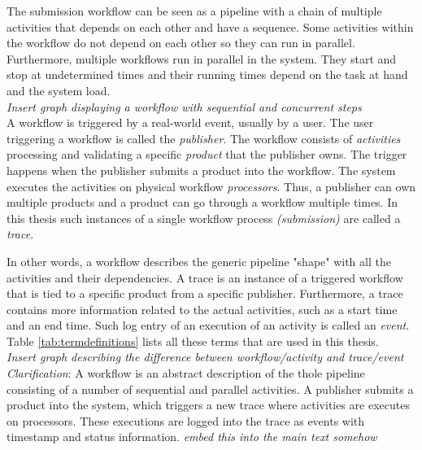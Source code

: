 \documentclass[english,12pt,a4paper,pdftex,sci,utf8]{aaltothesis}
\newcommand{\nyi}[1]{\colorbox{nyibg}{\textcolor{nyitext}{\emph{#1}}}}
\begin{document}
The submission workflow can be seen as a pipeline with a chain of multiple activities that depends on each other and have a sequence. 
Some activities within the workflow do not depend on each other so they can run in parallel.
Furthermore, multiple workflows run in parallel in the system.
They start and stop at undetermined times and their running times depend on the task at hand and the system load.\\

\nyi{Insert graph displaying a workflow with sequential and concurrent steps}\\

A workflow is triggered by a real-world event, usually by a user.
The user triggering a workflow is called the \emph{publisher}.
The workflow consists of \emph{activities} processing and validating a specific \emph{product} that the publisher owns.
The trigger happens when the publisher submits a product into the workflow.
The system executes the activities on physical workflow \emph{processors}.
Thus, a publisher can own multiple products and a product can go through a workflow multiple times.
In this thesis such instances of a single workflow process \emph{(submission)} are called a \emph{trace}.

In other words, a workflow describes the generic pipeline "shape" with all the activities and their dependencies.
A trace is an instance of a triggered workflow that is tied to a specific product from a specific publisher.
Furthermore, a trace contains more information related to the actual activities, such as a start time and an end time.
Such log entry of an execution of an activity is called an \emph{event}. Table \ref{tab:termdefinitions} lists all these terms that are used in this thesis.\\

\nyi{Insert graph describing the difference between workflow/activity and trace/event}\\

\nyi{Clarification}: A workflow is an abstract description of the thole pipeline consisting of a number of sequential and parallel activities. A publisher submits a product into the system, which triggers a new trace where activities are executes on processors. These executions are logged into the trace as events with timestamp and status information.
\nyi{embed this into the main text somehow}
\end{document}
